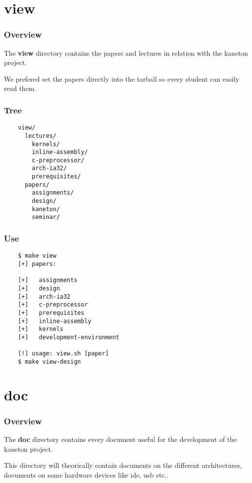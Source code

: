 %
%

\section{view}


\begin{frame}
  \frametitle{Overview}

  The \textbf{view} directory contains the papers and lectures
  in relation with the kaneton project.

  \nl

  We prefered set the papers directly into the tarball so every student
  can easily read them.
\end{frame}


\begin{frame}[containsverbatim]
  \frametitle{Tree}

  \begin{verbatim}
    view/
      lectures/
        kernels/
        inline-assembly/
        c-preprocessor/
        arch-ia32/
        prerequisites/
      papers/
        assignments/
        design/
        kaneton/
        seminar/
  \end{verbatim}
\end{frame}


\begin{frame}[containsverbatim]
  \frametitle{Use}

  \begin{verbatim}
    $ make view
    [+] papers:

    [+]   assignments
    [+]   design
    [+]   arch-ia32
    [+]   c-preprocessor
    [+]   prerequisites
    [+]   inline-assembly
    [+]   kernels
    [+]   development-environment

    [!] usage: view.sh [paper]
    $ make view-design
  \end{verbatim}
\end{frame}

%
%

\section{doc}


\begin{frame}
  \frametitle{Overview}

  The \textbf{doc} directory contains every document useful for
  the development of the kaneton project.

  \nl

  This directory will theorically contain documents on the different
  architectures, documents on some hardware devices like ide, usb etc..
\end{frame}


